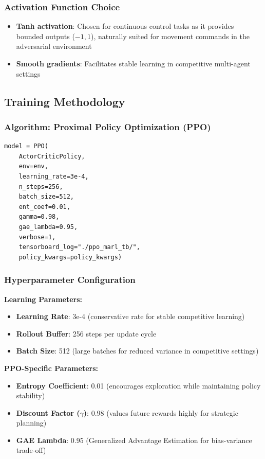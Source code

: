 \subsubsection{Activation Function Choice}
\begin{itemize}
    \item \textbf{Tanh activation}: Chosen for continuous control tasks as it provides bounded outputs ($-1, 1$), naturally suited for movement commands in the adversarial environment
    \item \textbf{Smooth gradients}: Facilitates stable learning in competitive multi-agent settings
\end{itemize}

\subsection{Training Methodology}

\subsubsection{Algorithm: Proximal Policy Optimization (PPO)}

\begin{verbatim}
model = PPO(
    ActorCriticPolicy,
    env=env,
    learning_rate=3e-4,
    n_steps=256,
    batch_size=512,
    ent_coef=0.01,
    gamma=0.98,
    gae_lambda=0.95,
    verbose=1,
    tensorboard_log="./ppo_marl_tb/",
    policy_kwargs=policy_kwargs)
\end{verbatim}

\subsubsection{Hyperparameter Configuration}

\textbf{Learning Parameters:}
\begin{itemize}
    \item \textbf{Learning Rate}: 3e-4 (conservative rate for stable competitive learning)
    \item \textbf{Rollout Buffer}: 256 steps per update cycle
    \item \textbf{Batch Size}: 512 (large batches for reduced variance in competitive settings)
\end{itemize}

\textbf{PPO-Specific Parameters:}
\begin{itemize}
    \item \textbf{Entropy Coefficient}: 0.01 (encourages exploration while maintaining policy stability)
    \item \textbf{Discount Factor ($\gamma$)}: 0.98 (values future rewards highly for strategic planning)
    \item \textbf{GAE Lambda}: 0.95 (Generalized Advantage Estimation for bias-variance trade-off)
\end{itemize}

